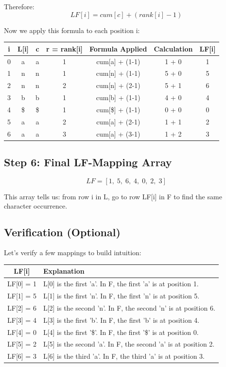 \begin{examplebox}
Therefore:
\[
LF[i] = cum[c] + (rank[i] - 1)
\]

Now we apply this formula to each position i:

\begin{center}
\begin{tabular}{|c|c|c|c|c|c|c|}
\hline
\textbf{i} & \textbf{L[i]} & \textbf{c} & \textbf{r = rank[i]} & \textbf{Formula Applied} & \textbf{Calculation} & \textbf{LF[i]} \\
\hline
0 & a & a & 1 & cum[a] + (1-1) & 1 + 0 & 1 \\
1 & n & n & 1 & cum[n] + (1-1) & 5 + 0 & 5 \\
2 & n & n & 2 & cum[n] + (2-1) & 5 + 1 & 6 \\
3 & b & b & 1 & cum[b] + (1-1) & 4 + 0 & 4 \\
4 & \$ & \$ & 1 & cum[\$] + (1-1) & 0 + 0 & 0 \\
5 & a & a & 2 & cum[a] + (2-1) & 1 + 1 & 2 \\
6 & a & a & 3 & cum[a] + (3-1) & 1 + 2 & 3 \\
\hline
\end{tabular}
\end{center}

\subsection*{Step 6: Final LF-Mapping Array}

\[
LF = [1,\; 5,\; 6,\; 4,\; 0,\; 2,\; 3]
\]

This array tells us: from row i in L, go to row LF[i] in F to find the same character occurrence.

\subsection*{Verification (Optional)}

Let's verify a few mappings to build intuition:

\begin{center}
\begin{tabular}{|c|l|}
\hline
\textbf{LF[i]} & \textbf{Explanation} \\
\hline
LF[0] = 1 & L[0] is the first 'a'. In F, the first 'a' is at position 1. \\
LF[1] = 5 & L[1] is the first 'n'. In F, the first 'n' is at position 5. \\
LF[2] = 6 & L[2] is the second 'n'. In F, the second 'n' is at position 6. \\
LF[3] = 4 & L[3] is the first 'b'. In F, the first 'b' is at position 4. \\
LF[4] = 0 & L[4] is the first '\$'. In F, the first '\$' is at position 0. \\
LF[5] = 2 & L[5] is the second 'a'. In F, the second 'a' is at position 2. \\
LF[6] = 3 & L[6] is the third 'a'. In F, the third 'a' is at position 3. \\
\hline
\end{tabular}
\end{center}

\end{examplebox}

